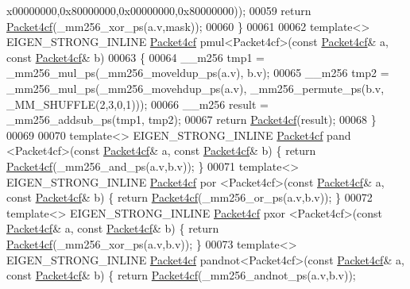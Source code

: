 \begin{DoxyCode}
      x00000000,0x80000000,0x00000000,0x80000000));
00059   \textcolor{keywordflow}{return} \hyperlink{struct_eigen_1_1internal_1_1_packet4cf}{Packet4cf}(\_mm256\_xor\_ps(a.v,mask));
00060 \}
00061 
00062 \textcolor{keyword}{template}<> EIGEN\_STRONG\_INLINE \hyperlink{struct_eigen_1_1internal_1_1_packet4cf}{Packet4cf} pmul<Packet4cf>(\textcolor{keyword}{const} 
      \hyperlink{struct_eigen_1_1internal_1_1_packet4cf}{Packet4cf}& a, \textcolor{keyword}{const} \hyperlink{struct_eigen_1_1internal_1_1_packet4cf}{Packet4cf}& b)
00063 \{
00064   \_\_m256 tmp1 = \_mm256\_mul\_ps(\_mm256\_moveldup\_ps(a.v), b.v);
00065   \_\_m256 tmp2 = \_mm256\_mul\_ps(\_mm256\_movehdup\_ps(a.v), \_mm256\_permute\_ps(b.v, \_MM\_SHUFFLE(2,3,0,1)));
00066   \_\_m256 result = \_mm256\_addsub\_ps(tmp1, tmp2);
00067   \textcolor{keywordflow}{return} \hyperlink{struct_eigen_1_1internal_1_1_packet4cf}{Packet4cf}(result);
00068 \}
00069 
00070 \textcolor{keyword}{template}<> EIGEN\_STRONG\_INLINE \hyperlink{struct_eigen_1_1internal_1_1_packet4cf}{Packet4cf} pand   <Packet4cf>(\textcolor{keyword}{const} 
      \hyperlink{struct_eigen_1_1internal_1_1_packet4cf}{Packet4cf}& a, \textcolor{keyword}{const} \hyperlink{struct_eigen_1_1internal_1_1_packet4cf}{Packet4cf}& b) \{ \textcolor{keywordflow}{return} \hyperlink{struct_eigen_1_1internal_1_1_packet4cf}{Packet4cf}(\_mm256\_and\_ps(a.v,b.v)); \}
00071 \textcolor{keyword}{template}<> EIGEN\_STRONG\_INLINE \hyperlink{struct_eigen_1_1internal_1_1_packet4cf}{Packet4cf} por    <Packet4cf>(\textcolor{keyword}{const} 
      \hyperlink{struct_eigen_1_1internal_1_1_packet4cf}{Packet4cf}& a, \textcolor{keyword}{const} \hyperlink{struct_eigen_1_1internal_1_1_packet4cf}{Packet4cf}& b) \{ \textcolor{keywordflow}{return} \hyperlink{struct_eigen_1_1internal_1_1_packet4cf}{Packet4cf}(\_mm256\_or\_ps(a.v,b.v)); \}
00072 \textcolor{keyword}{template}<> EIGEN\_STRONG\_INLINE \hyperlink{struct_eigen_1_1internal_1_1_packet4cf}{Packet4cf} pxor   <Packet4cf>(\textcolor{keyword}{const} 
      \hyperlink{struct_eigen_1_1internal_1_1_packet4cf}{Packet4cf}& a, \textcolor{keyword}{const} \hyperlink{struct_eigen_1_1internal_1_1_packet4cf}{Packet4cf}& b) \{ \textcolor{keywordflow}{return} \hyperlink{struct_eigen_1_1internal_1_1_packet4cf}{Packet4cf}(\_mm256\_xor\_ps(a.v,b.v)); \}
00073 \textcolor{keyword}{template}<> EIGEN\_STRONG\_INLINE \hyperlink{struct_eigen_1_1internal_1_1_packet4cf}{Packet4cf} pandnot<Packet4cf>(\textcolor{keyword}{const} 
      \hyperlink{struct_eigen_1_1internal_1_1_packet4cf}{Packet4cf}& a, \textcolor{keyword}{const} \hyperlink{struct_eigen_1_1internal_1_1_packet4cf}{Packet4cf}& b) \{ \textcolor{keywordflow}{return} \hyperlink{struct_eigen_1_1internal_1_1_packet4cf}{Packet4cf}(\_mm256\_andnot\_ps(a.v,b.v));

\end{DoxyCode}
